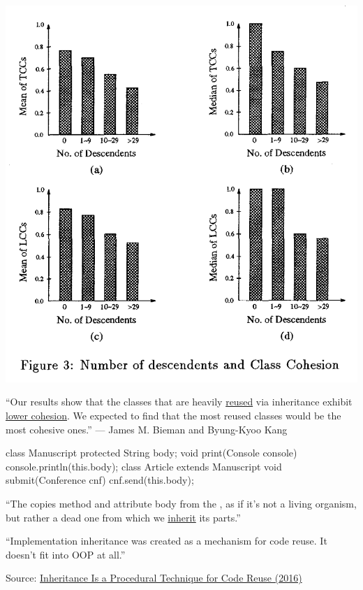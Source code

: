 \documentclass{article}
\begin{document}
\begin{multicols}{2}
\includegraphics[width=.9\columnwidth]{graphs.png}
\par\columnbreak\par
``Our results show that the classes that are heavily \ul{reused} via inheritance exhibit \ul{lower cohesion}. We expected to find that the most reused classes would be the most cohesive ones.'' --- James M. Bieman and Byung-Kyoo Kang
\end{multicols}
\plush{}

\begin{multicols}{2}
{\small\begin{ffcode}
class Manuscript {
  protected String body;
  void print(Console console) {
    console.println(this.body);
  }
}
class Article
  extends Manuscript {
  void submit(Conference cnf) {
    cnf.send(this.body);
  }
}
\end{ffcode}
}
\par\columnbreak\par
``The  copies method  and attribute body from the , as if it’s not a living organism, but rather a dead one from which we \ul{inherit} its parts.''\par
``Implementation inheritance was created as a mechanism for code reuse. It doesn't fit into OOP at all.''\par
{\scriptsize Source: \href{https://www.yegor256.com/2016/09/13/inheritance-is-procedural.html}{Inheritance Is a Procedural Technique for Code Reuse (2016)}\par}
\end{multicols}
\plush{}
\end{document}
